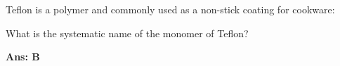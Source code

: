 \documentclass[border=3pt,varwidth=70mm]{standalone}
\begin{document}
Teflon is a polymer and commonly used as a non-stick coating for cookware:

\begin{center}
\end{center}

What is the systematic name of the monomer of Teflon?

\begin{choices}
\choice {}
\choice {}
\choice {}
\choice {}
\end{choices}


\begin{answer}
\hrulefill\par
\textbf{Ans: B}

\end{answer}
\end{document}
